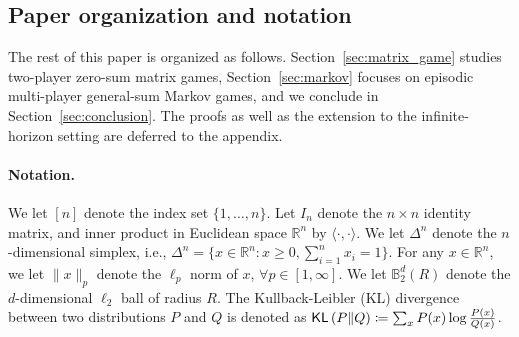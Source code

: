   

\subsection{Paper organization and notation}

The rest of this paper is organized as follows. Section~\ref{sec:matrix_game} studies two-player zero-sum matrix games,  Section~\ref{sec:markov} focuses on episodic multi-player general-sum Markov games, and we conclude in Section~\ref{sec:conclusion}. The proofs as well as the extension to the infinite-horizon setting are deferred to the appendix.

\paragraph{Notation.}
We let $[n]$ denote the index set $\{1, \dots, n\}$. Let $I_n$ denote the $n\times n$ identity matrix, and inner product in Euclidean space \(\mathbb{R}^n\) by $\langle\cdot,\cdot\rangle$. We let $\Delta^n$ denote the $n$-dimensional simplex, i.e., $\Delta^n=\{x\in\mathbb{R}^n: x\geq 0,\sum_{i=1}^n x_i=1\}$. For any $x\in\mathbb{R}^n$, we let $\|x\|_p$ denote the $\ell_p$ norm of $x$, $\forall p\in[1,\infty]$. We let $\mathbb{B}^d_2(R)$ denote the $d$-dimensional $\ell_2$ ball of radius $R$. The Kullback-Leibler (KL) divergence between two distributions $P$ and $Q$ is denoted as $\mathsf{KL}\left(P\|Q\right)\coloneqq \sum_{x}P(x)\log\frac{P(x)}{Q(x)}$.  